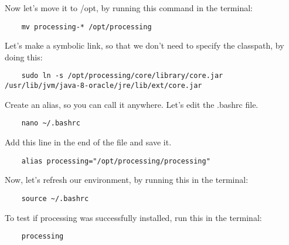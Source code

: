 \documentclass{article}
\begin{document}
Now let's move it to /opt, by running this command in the terminal:

\begin{lstlisting}
	mv processing-* /opt/processing
\end{lstlisting}

Let's make a symbolic link, so that we don't need to specify the classpath, by doing this:

\begin{lstlisting}
	sudo ln -s /opt/processing/core/library/core.jar /usr/lib/jvm/java-8-oracle/jre/lib/ext/core.jar
\end{lstlisting}

Create an alias, so you can call it anywhere. Let's edit the .bashrc file.

\begin{lstlisting}
	nano ~/.bashrc
\end{lstlisting}

\clearpage

Add this line in the end of the file and save it.

\begin{lstlisting}
	alias processing="/opt/processing/processing"
\end{lstlisting}

Now, let's refresh our environment, by running this in the terminal:

\begin{lstlisting}
	source ~/.bashrc
\end{lstlisting}

To test if processing was successfully installed, run this in the terminal:

\begin{lstlisting}
	processing
\end{lstlisting}
\end{document}
